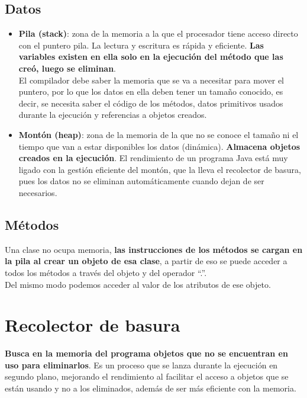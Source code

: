 \documentclass{article}
\begin{document}
\subsection{Datos}
\begin{itemize}
    \item \textbf{Pila (stack)}: zona de la memoria a la que el procesador tiene acceso directo con el puntero pila. La lectura y escritura es rápida y eficiente. \textbf{Las variables existen en ella solo en la ejecución del método que las creó, luego se eliminan}. \\
    El compilador debe saber la memoria que se va a necesitar para mover el puntero, por lo que los datos en ella deben tener un tamaño conocido, es decir, se necesita saber el código de los métodos, datos primitivos usados durante la ejecución y referencias a objetos creados.

    \item \textbf{Montón (heap)}: zona de la memoria de la que no se conoce el tamaño ni el tiempo que van a estar disponibles los datos (dinámica). \textbf{Almacena objetos creados en la ejecución}. El rendimiento de un programa Java está muy ligado con la gestión eficiente del montón, que la lleva el recolector de basura, pues los datos no se eliminan automáticamente cuando dejan de ser necesarios.
\end{itemize}

\subsection{Métodos}
Una clase no ocupa memoria, \textbf{las instrucciones de los métodos se cargan en la pila al crear un objeto de esa clase}, a partir de eso se puede acceder a todos los métodos a través del objeto y del operador “.”. \\
Del mismo modo podemos acceder al valor de los atributos de ese objeto.

\section{Recolector de basura}
\textbf{Busca en la memoria del programa objetos que no se encuentran en uso para eliminarlos}. Es un proceso que se lanza durante la ejecución en segundo plano, mejorando el rendimiento al facilitar el acceso a objetos que se están usando y no a los eliminados, además de ser más eficiente con la memoria. \\
\end{document}
